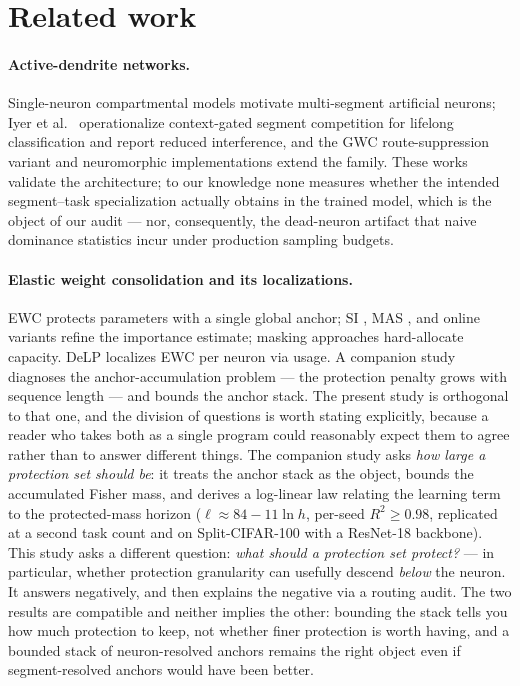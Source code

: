 \documentclass[review,12pt,number]{elsarticle}
\newcommand{\delp}{DeLP}
\begin{document}
\section{Related work}
\label{sec:related}

\paragraph{Active-dendrite networks.} Single-neuron compartmental models
\cite{poirazi2003,london2005,poirazi2020,ujfalussy2018} motivate
multi-segment artificial neurons; Iyer et al.\ \cite{iyer2022} operationalize
context-gated segment competition for lifelong classification and report
reduced interference, and the GWC route-suppression variant
\cite{boyle2025,baek2024} and neuromorphic implementations
\cite{boahen2022} extend the family. These works validate the architecture;
to our knowledge none measures whether the intended segment--task
specialization actually obtains in the trained model, which is the object
of our audit --- nor, consequently, the dead-neuron artifact that
naive dominance statistics incur under production sampling budgets.

\paragraph{Elastic weight consolidation and its localizations.} EWC
\cite{kirkpatrick2017} protects parameters with a single global anchor;
SI \cite{zenke2017}, MAS \cite{aljundi2018}, and online variants
\cite{chaudhry2018} refine the importance estimate; masking approaches
\cite{mallya2018,serra2018,masse2018} hard-allocate capacity. \delp{}
\cite{zhou2026delp} localizes EWC per neuron via usage. A companion
study \cite{zhou2026anchorbudget} diagnoses the anchor-accumulation
problem --- the protection penalty grows with sequence length --- and
bounds the anchor stack. The present study is orthogonal to that one, and
the division of questions is worth stating explicitly, because a reader
who takes both as a single program could reasonably expect them to agree
rather than to answer different things. The companion study asks
\emph{how large a protection set should be}: it treats the anchor stack
as the object, bounds the accumulated Fisher mass, and derives a
log-linear law relating the learning term to the protected-mass horizon
($\ell \approx 84 - 11\ln h$, per-seed $R^2 \ge 0.98$, replicated at a
second task count and on Split-CIFAR-100 with a ResNet-18 backbone). This
study asks a different question: \emph{what should a protection set
protect?} --- in particular, whether protection granularity can usefully
descend \emph{below} the neuron. It answers negatively, and then explains
the negative via a routing audit. The two results are compatible and
neither implies the other: bounding the stack tells you how much
protection to keep, not whether finer protection is worth having, and a
bounded stack of neuron-resolved anchors remains the right object even if
segment-resolved anchors would have been better.
\end{document}
